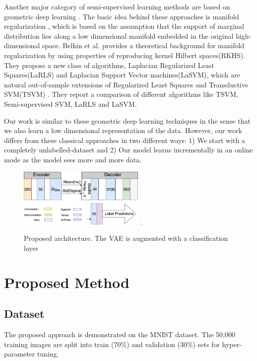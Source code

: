 \documentclass[runningheads]{llncs}
\begin{document}
Another major category of semi-supervised learning methods are based on geometric deep learning \cite{li_2018}\cite{mikhail_2006}\cite{ding_2018}.
The basic idea behind these approaches is manifold regularization \cite{mikhail_2006} \cite{ding_2018}, which is based on the assumption that the support of marginal distribution lies along a low dimensional manifold embedded in the original high-dimensional space.
Belkin et al. \cite{mikhail_2006} provides a theoretical background for manifold regularization by using properties of reproducing kernel Hilbert spaces(RKHS).
They propose a new class of algorithms, Laplacian Regularized Least Squares(LaRLS) and Laplacian Support Vector machines(LaSVM), which are natural out-of-sample extensions of Regularized Least Squares and Transductive SVM(TSVM) \cite{joachims_1999}.
They report a comparison of different algorithms like TSVM, Semi-supervised SVM\cite{bennett_1999}, LaRLS and LaSVM.

Our work is similar to these geometric deep learning techniques in the sense that we also learn a low dimensional representation of the data.
However, our work differs from these classical approaches in two different ways: 1) We start with a completely unlabelled-dataset and 2) Our model learns incrementally in an online mode as the model sees more and more data.

\begin{figure}[!t]
\centering
\includegraphics[width=2.4in]{images/var_arch_v5.jpg}
\DeclareGraphicsExtensions.
\caption{Proposed architecture. The VAE is augmented with a classification layer}
\label{vae_architecture}
\end{figure}
\section{Proposed Method}

\subsection{Dataset}
The proposed approach is demonstrated on the MNIST dataset.
The 50,000 training images are split into train (70\%) and validation (30\%) sets for hyper-parameter tuning.
\end{document}
